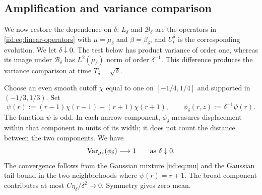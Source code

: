 \documentclass[11pt,reqno]{amsart}
\numberwithin{equation}{section}
\theoremstyle{plain}
\theoremstyle{remark}
\begin{document}
\subsection{Amplification and variance comparison}\label{iid:subsec:amplification}
We now restore the dependence on $\delta$: $L_\delta$ and $\mathcal B_\delta$ are the operators in \eqref{iid:eq:linear-operators} with $\mu=\mu_\delta$ and $\beta=\beta_\delta$, and $U_t^\delta$ is the corresponding evolution. We let $\delta\downarrow0$. The test below has product variance of order one, whereas its image under $\mathcal B_\delta$ has $L^2(\mu_\delta)$ norm of order $\delta^{-1}$. This difference produces the variance comparison at time $T_\delta=\sqrt\delta$.

Choose an even smooth cutoff $\chi$ equal to one on $[-1/4,1/4]$ and supported in $(-1/3,1/3)$. Set
\begin{equation}\label{iid:eq:test}
 \psi(r):=(r-1)\chi(r-1)+(r+1)\chi(r+1),
 \qquad \phi_\delta(r,z):=\delta^{-1}\psi(r).
\end{equation}
The function $\psi$ is odd. In each narrow component, $\phi_\delta$ measures displacement within that component in units of its width; it does not count the distance between the two components. We have
\begin{equation}\label{iid:eq:variance-name}
 \operatorname{Var}_{\mu_\delta}(\phi_\delta)\longrightarrow1\qquad\text{as }\delta\downarrow0.
\end{equation}
The convergence follows from the Gaussian mixture \eqref{iid:eq:mu} and the Gaussian tail bound \cite[Section~5.4]{BGL} in the two neighborhoods where $\psi(r)=r\mp1$. The broad component contributes at most $C\eta_\delta/\delta^2\to0$. Symmetry gives zero mean.
\end{document}
